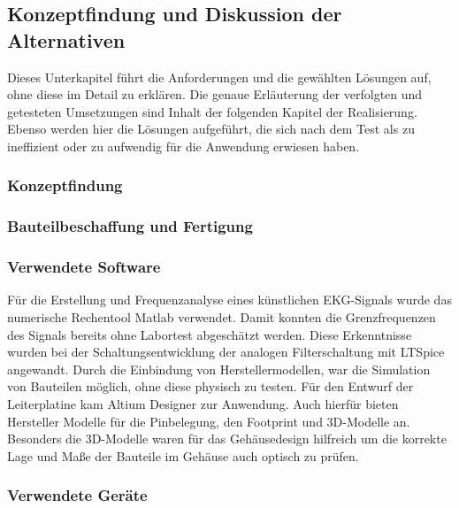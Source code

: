 
\subsection{Konzeptfindung und Diskussion der Alternativen}

Dieses Unterkapitel führt die Anforderungen und die gewählten Lösungen auf, ohne diese im Detail zu erklären. Die genaue Erläuterung der verfolgten und getesteten Umsetzungen sind Inhalt der folgenden Kapitel der Realisierung. Ebenso werden hier die Lösungen aufgeführt, die sich nach dem Test als zu ineffizient oder zu aufwendig für die Anwendung erwiesen haben.

\subsubsection{Konzeptfindung}

\subsubsection{Bauteilbeschaffung und Fertigung} 

\subsubsection{Verwendete Software}

Für die Erstellung und Frequenzanalyse eines künstlichen EKG-Signals wurde das numerische Rechentool Matlab verwendet. Damit konnten die Grenzfrequenzen des Signals bereits ohne Labortest abgeschätzt werden. Diese Erkenntnisse wurden bei der Schaltungsentwicklung der analogen Filterschaltung mit LTSpice angewandt. Durch die Einbindung von Herstellermodellen, war die Simulation von Bauteilen möglich, ohne diese physisch zu testen. Für den Entwurf der Leiterplatine kam Altium Designer zur Anwendung. Auch hierfür bieten Hersteller Modelle für die Pinbelegung, den Footprint und 3D-Modelle an. Besonders die 3D-Modelle waren für das Gehäusedesign hilfreich um die korrekte Lage und Maße der Bauteile im Gehäuse auch optisch zu prüfen.

\subsubsection{Verwendete Geräte}


